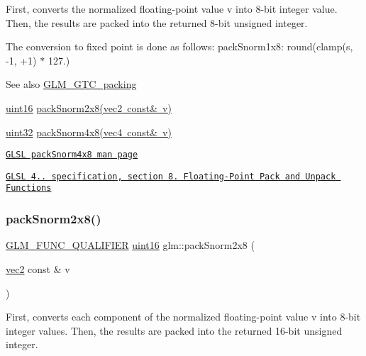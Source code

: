 First, converts the normalized floating-\/point value v into 8-\/bit integer value. Then, the results are packed into the returned 8-\/bit unsigned integer.

The conversion to fixed point is done as follows\+: pack\+Snorm1x8\+: round(clamp(s, -\/1, +1) $\ast$ 127.)

\begin{DoxySeeAlso}{See also}
\mbox{\hyperlink{group__gtc__packing}{G\+L\+M\+\_\+\+G\+T\+C\+\_\+packing}} 

\mbox{\hyperlink{group__gtc__type__precision_gad8c2939e1fdd8e5828b31d95c52255d5}{uint16}} \mbox{\hyperlink{group__gtc__packing_ga05d08a82923166ec7cd5d0e6154c9953}{pack\+Snorm2x8(vec2 const\& v)}} 

\mbox{\hyperlink{group__gtc__type__precision_ga202b6a53c105fcb7e531f9b443518451}{uint32}} \mbox{\hyperlink{group__core__func__packing_ga85e8f17627516445026ab7a9c2e3531a}{pack\+Snorm4x8(vec4 const\& v)}} 

\href{http://www.opengl.org/sdk/docs/manglsl/xhtml/packSnorm4x8.xml}{\tt G\+L\+SL pack\+Snorm4x8 man page} 

\href{http://www.opengl.org/registry/doc/GLSLangSpec.4.20.8.pdf}{\tt G\+L\+SL 4.. specification, section 8. Floating-\/\+Point Pack and Unpack Functions} 
\end{DoxySeeAlso}
\mbox{\label{group__gtc__packing_ga05d08a82923166ec7cd5d0e6154c9953}} 
\subsubsection{\texorpdfstring{pack\+Snorm2x8()}{packSnorm2x8()}}
{\footnotesize\ttfamily \mbox{\hyperlink{setup_8hpp_a33fdea6f91c5f834105f7415e2a64407}{G\+L\+M\+\_\+\+F\+U\+N\+C\+\_\+\+Q\+U\+A\+L\+I\+F\+I\+ER}} \mbox{\hyperlink{group__gtc__type__precision_gad8c2939e1fdd8e5828b31d95c52255d5}{uint16}} glm\+::pack\+Snorm2x8 (\begin{DoxyParamCaption}\item[{\mbox{\hyperlink{group__core__types_gaa1618f51db67eaa145db101d8c8431d8}{vec2}} const \&}]{v }\end{DoxyParamCaption})}

First, converts each component of the normalized floating-\/point value v into 8-\/bit integer values. Then, the results are packed into the returned 16-\/bit unsigned integer.

